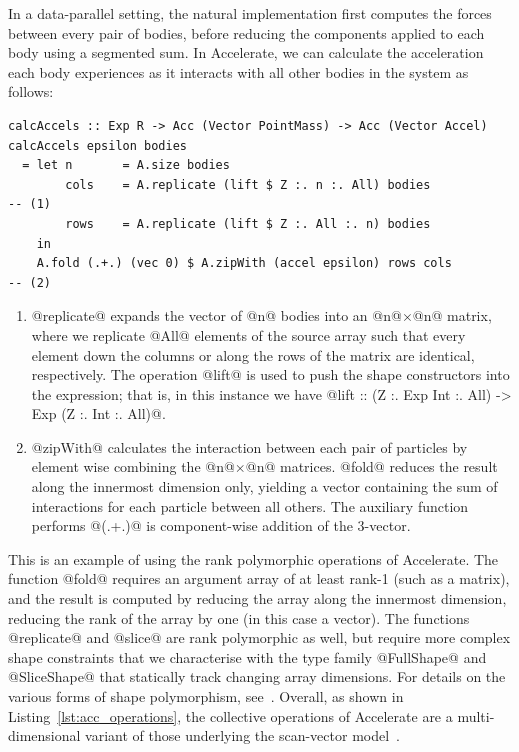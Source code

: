 In a data-parallel setting, the natural implementation first computes the forces
between every pair of bodies, before reducing the components applied to each
body using a segmented sum. In Accelerate, we can calculate the acceleration
each body experiences as it interacts with all other bodies in the system as
follows:
%
\begin{lstlisting}[style=haskell]
calcAccels :: Exp R -> Acc (Vector PointMass) -> Acc (Vector Accel)
calcAccels epsilon bodies
  = let n       = A.size bodies
        cols    = A.replicate (lift $ Z :. n :. All) bodies                        -- (1)
        rows    = A.replicate (lift $ Z :. All :. n) bodies
    in
    A.fold (.+.) (vec 0) $ A.zipWith (accel epsilon) rows cols                     -- (2)
\end{lstlisting}
%
\begin{enumerate}
\item @replicate@ expands the vector of @n@ bodies into an @n@$\times$@n@
    matrix, where we replicate @All@ elements of the source array such that
    every element down the columns or along the rows of the matrix are
    identical, respectively. The operation @lift@ is used to push the shape
    constructors into the expression; that is, in this instance we have
    @lift :: (Z :. Exp Int :. All) -> Exp (Z :. Int :. All)@.

\item @zipWith@ calculates the interaction between each pair of particles by
    element wise combining the @n@$\times$@n@ matrices. @fold@ reduces the
    result along the innermost dimension only, yielding a vector containing the
    sum of interactions for each particle between all others. The auxiliary
    function performs @(.+.)@ is component-wise addition of the 3-vector.
\end{enumerate}

This is an example of using the rank polymorphic operations of Accelerate. The
function @fold@ requires an argument array of at least rank-1 (such as a
matrix), and the result is computed by reducing the array along the innermost
dimension, reducing the rank of the array by one (in this case a vector). The
functions @replicate@ and @slice@ are rank polymorphic as well, but require more
complex shape constraints that we characterise with the type family @FullShape@
and @SliceShape@ that statically track changing array dimensions. For details on
the various forms of shape polymorphism, see~\cite{Keller:2010er}. Overall, as
shown in Listing~\ref{lst:acc_operations}, the collective operations of
Accelerate are a multi-dimensional variant of those underlying the scan-vector
model~\cite{Chatterjee:1990vj,Sengupta:2007tc}.


